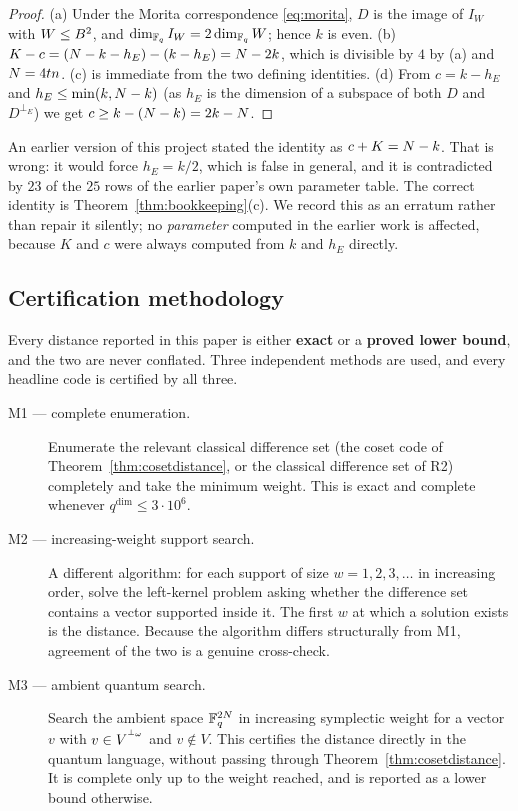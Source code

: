 \begin{proof}
(a) Under the Morita correspondence \eqref{eq:morita}, $D$ is the image of
$I_W$ with $W\le B^2$, and $\dim_{\mathbb F_q}I_W=2\dim_{\mathbb F_q}W$; hence $k$ is even.
(b) $K-c=(N-k-h_E)-(k-h_E)=N-2k$, which is divisible by $4$ by (a)
and $N=4tn$. (c) is immediate from the two defining identities. (d) From
$c=k-h_E$ and $h_E\le\min(k,N-k)$ (as $h_E$ is the dimension of a subspace
of both $D$ and $D^{\perp_E}$) we get $c\ge k-(N-k)=2k-N$.
\end{proof}

\begin{remark}[erratum]
An earlier version of this project stated the identity as $c+K=N-k$. That
is wrong: it would force $h_E=k/2$, which is false in general, and it is
contradicted by $23$ of the $25$ rows of the earlier paper's own parameter
table. The correct identity is Theorem~\ref{thm:bookkeeping}(c). We record this
as an erratum rather than repair it silently; no \emph{parameter} computed in
the earlier work is affected, because $K$ and $c$ were always computed from
$k$ and $h_E$ directly.
\end{remark}

\subsection{Certification methodology}

Every distance reported in this paper is either \textbf{exact} or a
\textbf{proved lower bound}, and the two are never conflated. Three
independent methods are used, and every headline code is certified by all three.

\begin{description}
\item[M1 --- complete enumeration.] Enumerate the relevant classical difference
  set (the coset code of Theorem~\ref{thm:cosetdistance}, or the classical
  difference set of R2) completely and take the minimum weight. This is exact
  and complete whenever $q^{\dim}\le3\cdot10^6$.
\item[M2 --- increasing-weight support search.] A different algorithm: for each
  support of size $w=1,2,3,\dots$ in increasing order, solve the left-kernel
  problem asking whether the difference set contains a vector supported inside
  it. The first $w$ at which a solution exists is the distance. Because the
  algorithm differs structurally from M1, agreement of the two is a genuine
  cross-check.
\item[M3 --- ambient quantum search.] Search the ambient space
  $\mathbb F_q^{2N}$ in increasing symplectic weight for a vector $v$ with
  $v\in V^{{}^{\perp_\omega}}$ and $v\notin V$. This certifies the distance directly in
  the quantum language, without passing through
  Theorem~\ref{thm:cosetdistance}. It is complete only up to the weight reached,
  and is reported as a lower bound otherwise.
\end{description}

